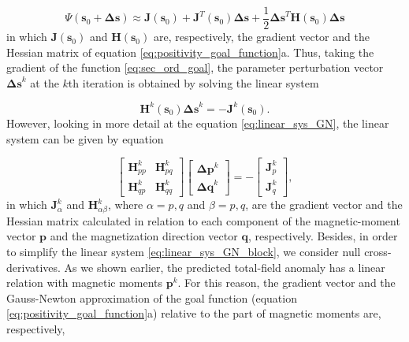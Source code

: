 \begin{equation}
\Psi(\mathbf{s}_0 + \mathbf{\Delta s}) \approx \mathbf{J}(\mathbf{s}_0) + \mathbf{J}^T(\mathbf{s}_0)  \mathbf{\Delta s} + 
\frac{1}{2} \mathbf{\Delta s}^T \mathbf{H}(\mathbf{s}_0) \mathbf{\Delta s}
\label{eq:sec_ord_goal}
\end{equation}
in which $\mathbf{J}(\mathbf{s}_0)$ and $\mathbf{H}(\mathbf{s}_0)$ are, respectively, the gradient vector and the Hessian matrix of equation \ref{eq:positivity_goal_function}a. Thus, taking the gradient of the function \ref{eq:sec_ord_goal}, the parameter perturbation vector $\mathbf{\Delta s}^k$ at the $k$th iteration is obtained by solving the linear system

\begin{equation}
\mathbf{H}^k (\mathbf{s}_0) \mathbf{\Delta s}^k = - \mathbf{J}^k (\mathbf{s}_0).
\label{eq:linear_sys_GN}
\end{equation} 
However, looking in more detail at the equation \ref{eq:linear_sys_GN}, the linear system can be given by equation 

\begin{equation}
\left[
\begin{array}{c|c}
\mathbf{H}_{pp}^{k} & \mathbf{H}_{pq}^{k} \\
\hline
\mathbf{H}_{qp}^{k}& \mathbf{H}_{qq}^{k}
\end{array}
\right] \left[ \begin{array}{c}
\mathbf{\Delta p}^k \\ 
\mathbf{\Delta q}^k 
\end{array} \right] = -\left[ \begin{array}{c}
\mathbf{J}_{p}^{k} \\ 
\mathbf{J}_{q}^{k} 
\end{array} \right] ,
\label{eq:linear_sys_GN_block}
\end{equation}
in which $\mathbf{J}_{\alpha}^{k}$ and $\mathbf{H}_{\alpha \beta}^{k}$, where $\alpha = p,q$ and $\beta = p,q$, are the gradient vector and the Hessian matrix calculated in relation to each component of the magnetic-moment vector $\mathbf{p}$ and the magnetization direction vector $\mathbf{q}$, respectively. Besides, in order to simplify the linear system \ref{eq:linear_sys_GN_block}, we consider null cross-derivatives. As we shown earlier, the predicted total-field anomaly has a linear relation with magnetic moments $\mathbf{p}^k$.  For this reason, the gradient vector and the Gauss-Newton approximation of the goal function (equation \ref{eq:positivity_goal_function}a) relative to the part of magnetic moments are, respectively,

